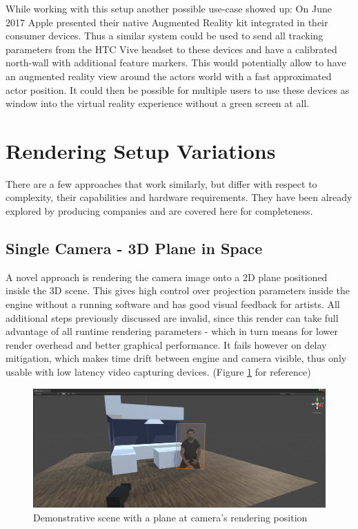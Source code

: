 While working with this setup another possible use-case showed up: On June 2017 
Apple presented their native Augmented Reality kit integrated in their consumer 
devices. Thus a similar system could be used to send all tracking parameters 
from the HTC Vive headset to these devices and have a calibrated north-wall 
with additional feature markers. This would potentially allow to have an 
augmented reality view around the actors world with a fast approximated actor 
position. It could then be possible for multiple users to use these devices as 
window into the virtual reality experience without a green screen at all.

\section{Rendering Setup Variations}

There are a few approaches that work similarly, but differ with respect to 
complexity, their capabilities and hardware requirements. They have been 
already explored by producing companies and are covered here for completeness.

\subsection{Single Camera - 3D Plane in Space}

A novel approach is rendering the camera image onto a 2D plane positioned 
inside the 3D scene. This gives high control over projection parameters inside 
the engine without a running software and has good visual feedback for artists. 
All additional steps previously discussed are invalid, since this render can 
take full advantage of all runtime rendering parameters - which in turn means 
for lower render overhead and better graphical performance. It fails however on 
delay mitigation, which makes time drift between engine and camera visible, 
thus only usable with low latency video capturing devices. (Figure 
\ref{fig:alt-render:single-camera} for reference)

\begin{figure}[htb]
	\includegraphics[width=\textwidth]{gfx/eval/plane-scene.png}
	\caption{Demonstrative scene with a plane at camera's rendering position}
	\label{fig:alt-render:single-camera}
\end{figure}

